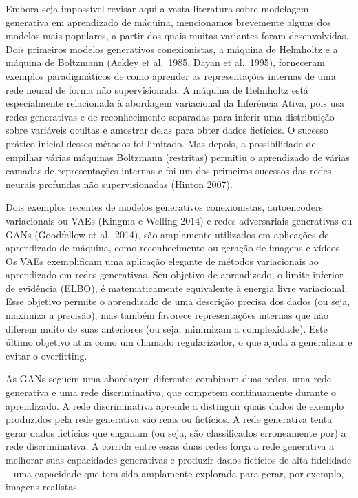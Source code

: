 \documentclass[
  12pt,
]{book}
\begin{document}
Embora seja impossível revisar aqui a vasta literatura sobre modelagem generativa em aprendizado de máquina, mencionamos brevemente alguns dos modelos mais populares, a partir dos quais muitas variantes foram desenvolvidas. Dois primeiros modelos generativos conexionistas, a máquina de Helmholtz e a máquina de Boltzmann (Ackley et al.~1985, Dayan et al.~1995), forneceram exemplos paradigmáticos de como aprender as representações internas de uma rede neural de forma não supervisionada. A máquina de Helmholtz está especialmente relacionada à abordagem variacional da Inferência Ativa, pois usa redes generativas e de reconhecimento separadas para inferir uma distribuição sobre variáveis \hspace{0pt}\hspace{0pt}ocultas e amostrar delas para obter dados fictícios. O sucesso prático inicial desses métodos foi limitado. Mas depois, a possibilidade de empilhar várias máquinas Boltzmann (restritas) permitiu o aprendizado de várias camadas de representações internas e foi um dos primeiros sucessos das redes neurais profundas não supervisionadas (Hinton 2007).

Dois exemplos recentes de modelos generativos conexionistas, autoencoders variacionais ou VAEs (Kingma e Welling 2014) e redes adversariais generativas ou GANs (Goodfellow et al.~2014), são amplamente utilizados em aplicações de aprendizado de máquina, como reconhecimento ou geração de imagens e vídeos. Os VAEs exemplificam uma aplicação elegante de métodos variacionais ao aprendizado em redes generativas. Seu objetivo de aprendizado, o limite inferior de evidência (ELBO), é matematicamente equivalente à energia livre variacional. Esse objetivo permite o aprendizado de uma descrição precisa dos dados (ou seja, maximiza a precisão), mas também favorece representações internas que não diferem muito de suas anteriores (ou seja, minimizam a complexidade). Este último objetivo atua como um chamado regularizador, o que ajuda a generalizar e evitar o overfitting.

As GANs seguem uma abordagem diferente: combinam duas redes, uma rede generativa e uma rede discriminativa, que competem continuamente durante o aprendizado. A rede discriminativa aprende a distinguir quais dados de exemplo produzidos pela rede generativa são reais ou fictícios. A rede generativa tenta gerar dados fictícios que enganam (ou seja, são classificados erroneamente por) a rede discriminativa. A corrida entre essas duas redes força a rede generativa a melhorar suas capacidades generativas e produzir dados fictícios de alta fidelidade -- uma capacidade que tem sido amplamente explorada para gerar, por exemplo, imagens realistas.
\end{document}
